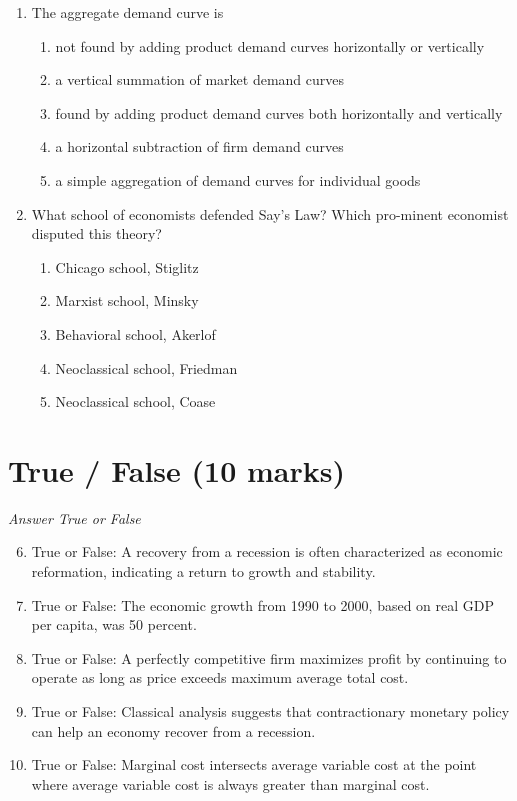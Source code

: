 \documentclass[12pt]{article}
\begin{document}
\begin{enumerate}[label=\arabic*.]
\begin{enumerate}[label=(\alph*)]
\end{enumerate}
\item The aggregate demand curve is
\begin{enumerate}[label=(\alph*)]
    \item not found by adding product demand curves horizontally or vertically
    \item a vertical summation of market demand curves
    \item found by adding product demand curves both horizontally and vertically
    \item a horizontal subtraction of firm demand curves
    \item a simple aggregation of demand curves for individual goods
\end{enumerate}
\item What school of economists defended Say's Law? Which pro-minent economist disputed this theory?
\begin{enumerate}[label=(\alph*)]
    \item Chicago school, Stiglitz
    \item Marxist school, Minsky
    \item Behavioral school, Akerlof
    \item Neoclassical school, Friedman
    \item Neoclassical school, Coase
\end{enumerate}
\end{enumerate}

\section*{True / False (10 marks)}
\textit{Answer True or False}
\begin{enumerate}[label=\arabic*.]
\setcounter{enumi}{5}
\item True or False: A recovery from a recession is often characterized as economic reformation, indicating a return to growth and stability.
\item True or False: The economic growth from 1990 to 2000, based on real GDP per capita, was 50 percent.
\item True or False: A perfectly competitive firm maximizes profit by continuing to operate as long as price exceeds maximum average total cost.
\item True or False: Classical analysis suggests that contractionary monetary policy can help an economy recover from a recession.
\item True or False: Marginal cost intersects average variable cost at the point where average variable cost is always greater than marginal cost.
\end{enumerate}
\end{document}
